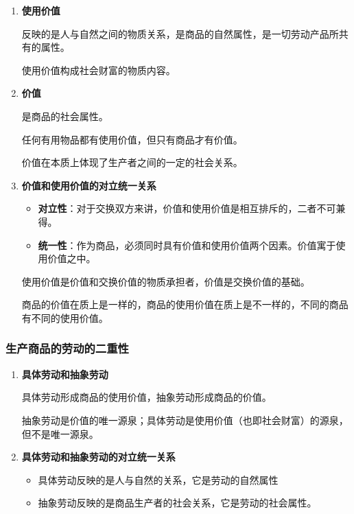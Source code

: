 \documentclass[12pt, a4paper, oneside]{ctexart}
\begin{document}
\begin{enumerate}
  \item {\bf 使用价值}
  
  反映的是人与自然之间的物质关系，是商品的自然属性，是一切劳动产品所共有的属性。

  使用价值构成社会财富的物质内容。

  \item {\bf 价值}
  
  是商品的社会属性。

  任何有用物品都有使用价值，但只有商品才有价值。

  价值在本质上体现了生产者之间的一定的社会关系。

  \item {\bf 价值和使用价值的对立统一关系}
  
  \begin{itemize}
    \item {\bf 对立性}：对于交换双方来讲，价值和使用价值是相互排斥的，二者不可兼得。
    \item {\bf 统一性}：作为商品，必须同时具有价值和使用价值两个因素。价值寓于使用价值之中。
  \end{itemize}

  使用价值是价值和交换价值的物质承担者，价值是交换价值的基础。

  商品的价值在质上是一样的，商品的使用价值在质上是不一样的，不同的商品有不同的使用价值。
\end{enumerate}

\subsubsection{生产商品的劳动的二重性}

\begin{enumerate}
  \item {\bf 具体劳动和抽象劳动}
  
  具体劳动形成商品的使用价值，抽象劳动形成商品的价值。

  抽象劳动是价值的唯一源泉；具体劳动是使用价值（也即社会财富）的源泉，但不是唯一源泉。

  \item {\bf 具体劳动和抽象劳动的对立统一关系}
  
  \begin{itemize}
    \item 具体劳动反映的是人与自然的关系，它是劳动的自然属性
    \item 抽象劳动反映的是商品生产者的社会关系，它是劳动的社会属性。
  \end{itemize}
\end{enumerate}
\end{document}
